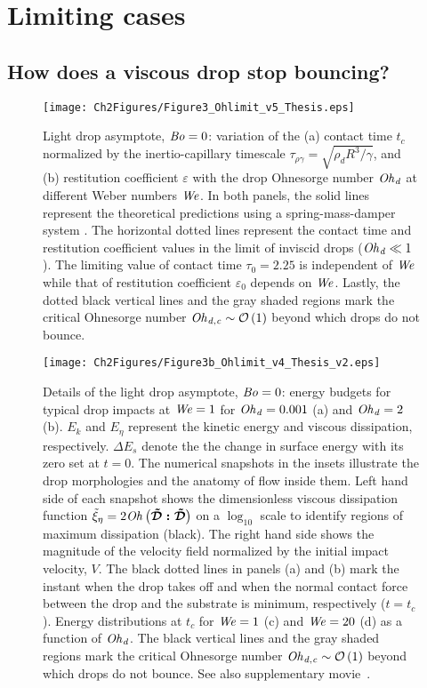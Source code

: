 \section{Limiting cases}\label{sec:LimitingCases}
\subsection{How does a viscous drop stop bouncing?}\label{sec:LimitingCases:Oh}
\begin{figure}
	\centering
	\texttt{[image: Ch2Figures/Figure3\_Ohlimit\_v5\_Thesis.eps]}
	\caption{Light drop asymptote, $\mathit{Bo} = 0$: variation of the (a) contact time $t_c$ normalized by the inertio-capillary timescale $\tau_{\rho\gamma} = \sqrt{\rho_dR^3/\gamma}$, and (b) restitution coefficient $\varepsilon$ with the drop Ohnesorge number $\mathit{Oh}_\mathit{d}$ at different Weber numbers $\mathit{We}$. In both panels, the solid lines represent the theoretical predictions using a spring-mass-damper system \citep[contact time, equation~\eqref{eqn:JhaEtAl_time} and restitution coefficient, equation~\eqref{eqn:JhaEtAl_epsilon},][]{jha2020viscous}. The horizontal dotted lines represent the contact time and restitution coefficient values in the limit of inviscid drops ($\mathit{Oh}_\mathit{d} \ll 1$). The limiting value of contact time $\tau_0 = 2.25$ is independent of $\mathit{We}$ while that of restitution coefficient $\varepsilon_0$ depends on $\mathit{We}$. Lastly, the dotted black vertical lines and the gray shaded regions mark the critical Ohnesorge number $\mathit{Oh}_\mathit{d,c} \sim \mathcal{O}\left(1\right)$ beyond which drops do not bounce.}
	\label{fig:Ohlim}
\end{figure}
\begin{figure}
	\centering
	\texttt{[image: Ch2Figures/Figure3b\_Ohlimit\_v4\_Thesis\_v2.eps]}
	\caption{Details of the light drop asymptote, $\mathit{Bo} = 0$: energy budgets for typical drop impacts at $\mathit{We} = 1$ for $\mathit{Oh}_\mathit{d} = 0.001$ (a) and $\mathit{Oh}_\mathit{d} =  2$ (b). $E_k$ and $E_\eta$ represent the kinetic energy and viscous dissipation, respectively. $\Delta E_s$ denote the the change in surface energy with its zero set at $t = 0$. The numerical snapshots in the insets illustrate the drop morphologies and the anatomy of flow inside them. Left hand side of each snapshot shows the dimensionless viscous dissipation function $\tilde{\xi}_\eta = 2\mathit{Oh}\left(\boldsymbol{\tilde{\mathcal{D}}:\tilde{\mathcal{D}}}\right)$ on a $\log_{10}$ scale to identify regions of maximum dissipation (black). The right hand side shows the magnitude of the velocity field normalized by the initial impact velocity, $V$. The black dotted lines in panels (a) and (b) mark the instant when the drop takes off and when the normal contact force between the drop and the substrate is minimum, respectively ($t = t_c$). Energy distributions at $t_c$ for $\mathit{We} = 1$ (c)  and $\mathit{We} = 20$ (d) as a function of $\mathit{Oh}_\mathit{d}$. The black vertical lines and the gray shaded regions mark the critical Ohnesorge number $\mathit{Oh}_\mathit{d,c} \sim \mathcal{O}\left(1\right)$ beyond which drops do not bounce. See also supplementary movie~.}
	\label{fig:OhlimDescription}
\end{figure}


